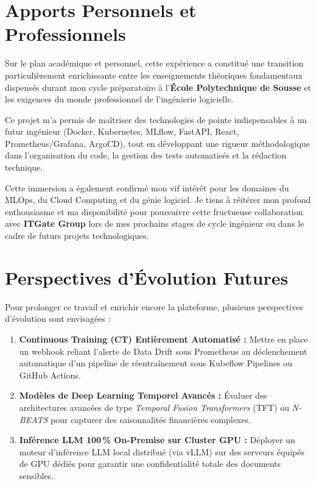 \documentclass[11pt,a4paper,oneside]{report}
\begin{document}
\section*{Apports Personnels et Professionnels}
Sur le plan académique et personnel, cette expérience a constitué une transition particulièrement enrichissante entre les enseignements théoriques fondamentaux dispensés durant mon cycle préparatoire à l'\textbf{École Polytechnique de Sousse} et les exigences du monde professionnel de l'ingénierie logicielle.

Ce projet m'a permis de maîtriser des technologies de pointe indispensables à un futur ingénieur (Docker, Kubernetes, MLflow, FastAPI, React, Prometheus/Grafana, ArgoCD), tout en développant une rigueur méthodologique dans l'organisation du code, la gestion des tests automatisés et la rédaction technique.

Cette immersion a également confirmé mon vif intérêt pour les domaines du MLOps, du Cloud Computing et du génie logiciel. Je tiens à réitérer mon profond enthousiasme et ma disponibilité pour poursuivre cette fructueuse collaboration avec \textbf{ITGate Group} lors de mes prochains stages de cycle ingénieur ou dans le cadre de futurs projets technologiques.

\section*{Perspectives d'Évolution Futures}
Pour prolonger ce travail et enrichir encore la plateforme, plusieurs perspectives d'évolution sont envisagées :
\begin{enumerate}[leftmargin=0.8cm, itemsep=0.5pt, topsep=1pt]
    \item \textbf{Continuous Training (CT) Entièrement Automatisé :} Mettre en place un webhook reliant l'alerte de Data Drift sous Prometheus au déclenchement automatique d'un pipeline de réentraînement sous Kubeflow Pipelines ou GitHub Actions.
    \item \textbf{Modèles de Deep Learning Temporel Avancés :} Évaluer des architectures avancées de type \textit{Temporal Fusion Transformers} (TFT) ou \textit{N-BEATS} pour capturer des saisonnalités financières complexes.
    \item \textbf{Inférence LLM 100\,\% On-Premise sur Cluster GPU :} Déployer un moteur d'inférence LLM local distribué (via vLLM) sur des serveurs équipés de GPU dédiés pour garantir une confidentialité totale des documents sensibles.
\end{enumerate}
\end{document}
